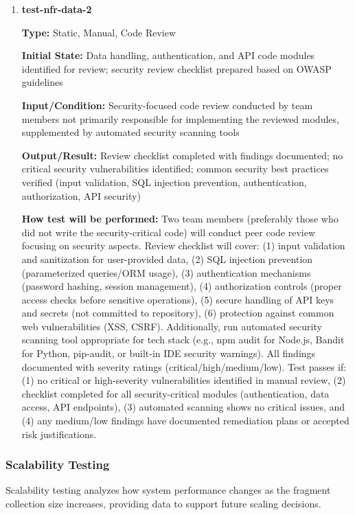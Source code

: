 \documentclass[12pt, titlepage]{article}
\begin{document}
\begin{enumerate}
\item \textbf{test-nfr-data-2}

\textbf{Type:} Static, Manual, Code Review

\textbf{Initial State:} Data handling, authentication, and API code modules identified for review; security review checklist prepared based on OWASP guidelines

\textbf{Input/Condition:} Security-focused code review conducted by team members not primarily responsible for implementing the reviewed modules, supplemented by automated security scanning tools

\textbf{Output/Result:} Review checklist completed with findings documented; no critical security vulnerabilities identified; common security best practices verified (input validation, SQL injection prevention, authentication, authorization, API security)

\textbf{How test will be performed:} Two team members (preferably those who did not write the security-critical code) will conduct peer code review focusing on security aspects. Review checklist will cover: (1) input validation and sanitization for user-provided data, (2) SQL injection prevention (parameterized queries/ORM usage), (3) authentication mechanisms (password hashing, session management), (4) authorization controls (proper access checks before sensitive operations), (5) secure handling of API keys and secrets (not committed to repository), (6) protection against common web vulnerabilities (XSS, CSRF). Additionally, run automated security scanning tool appropriate for tech stack (e.g., npm audit for Node.js, Bandit for Python, pip-audit, or built-in IDE security warnings). All findings documented with severity ratings (critical/high/medium/low). Test passes if: (1) no critical or high-severity vulnerabilities identified in manual review, (2) checklist completed for all security-critical modules (authentication, data access, API endpoints), (3) automated scanning shows no critical issues, and (4) any medium/low findings have documented remediation plans or accepted risk justifications.

\end{enumerate}

\subsubsection{Scalability Testing}

Scalability testing analyzes how system performance changes as the fragment collection size increases, providing data to support future scaling decisions.
\end{document}
